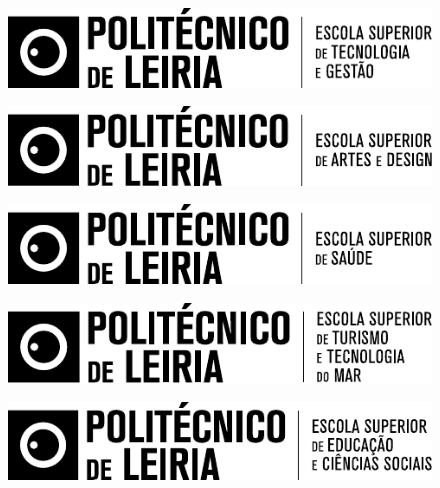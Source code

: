 \begin{titlepage}
    \latofont %
   
    \ifbwcover
        \color{frontpagedark} %
    \else
        \color{white} %
    \fi
    
    \vspace*{\baselineskip} %

    \ifbwcover
        \ifestg
            \begin{figure}
                \includegraphics[width=0.485\linewidth]{Figures/Theme/Logotypes/IPLeiria-ESTG-Logo-B.pdf}
            \end{figure}
        \fi
        \ifesad
            \begin{figure}
                \includegraphics[width=0.485\linewidth]{Figures/Theme/Logotypes/IPLeiria-ESAD-Logo-B.pdf}
            \end{figure}
        \fi
        \ifesslei
            \begin{figure}
                \includegraphics[width=0.485\linewidth]{Figures/Theme/Logotypes/IPLeiria-ESSLEI-Logo-B.pdf}
            \end{figure}
        \fi
        \ifestm
            \begin{figure}
                \includegraphics[width=0.485\linewidth]{Figures/Theme/Logotypes/IPLeiria-ESTM-Logo-B.pdf}
            \end{figure}
        \fi
        \ifesecs
            \begin{figure}
                \includegraphics[width=0.485\linewidth]{Figures/Theme/Logotypes/IPLeiria-ESECS-Logo-B.pdf}

\end{figure}
\end{titlepage}
